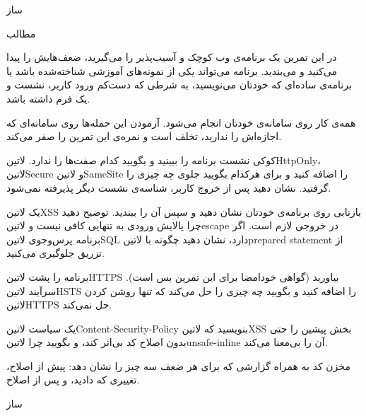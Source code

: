 \documentclass{../is-assignment}
\begin{document}
‌ساز

‌مطالب


در این تمرین یک برنامه‌ی وب کوچک و آسیب‌پذیر را می‌گیرید، ضعف‌هایش را پیدا می‌کنید و می‌بندید.
برنامه می‌تواند یکی از نمونه‌های آموزشی شناخته‌شده باشد یا برنامه‌ی ساده‌ای که خودتان می‌نویسید،
به شرطی که دست‌کم ورود کاربر، نشست و یک فرم داشته باشد.

همه‌ی کار روی سامانه‌ی خودتان انجام می‌شود.
آزمودن این حمله‌ها روی سامانه‌ای که اجازه‌اش را ندارید، تخلف است و نمره‌ی این تمرین را صفر می‌کند.


 کوکی نشست برنامه را ببینید و بگویید کدام صفت‌ها را ندارد.
 ‌لاتین{HttpOnly}، ‌لاتین{Secure} و ‌لاتین{SameSite} را اضافه کنید و برای هرکدام بگویید جلوی چه چیزی را گرفتید.
 نشان دهید پس از خروج کاربر، شناسه‌ی نشست دیگر پذیرفته نمی‌شود.



 یک ‌لاتین{XSS} بازتابی روی برنامه‌ی خودتان نشان دهید و سپس آن را ببندید.
      توضیح دهید چرا پالایش ورودی به تنهایی کافی نیست و ‌لاتین{escape} در خروجی لازم است.
 اگر برنامه پرس‌وجوی ‌لاتین{SQL} دارد، نشان دهید چگونه با ‌لاتین{prepared statement} از تزریق جلوگیری می‌کنید.



 برنامه را پشت ‌لاتین{HTTPS} بیاورید (گواهی خودامضا برای این تمرین بس است).
 سرآیند ‌لاتین{HSTS} را اضافه کنید و بگویید چه چیزی را حل می‌کند که تنها روشن کردن ‌لاتین{HTTPS} حل نمی‌کند.


یک سیاست ‌لاتین{Content-Security-Policy} بنویسید که ‌لاتین{XSS} بخش پیشین را حتی بدون اصلاح کد بی‌اثر کند،
و بگویید چرا ‌لاتین{unsafe-inline} آن را بی‌معنا می‌کند.


مخزن کد به همراه گزارشی که برای هر ضعف سه چیز را نشان دهد: پیش از اصلاح، تغییری که دادید، و پس از اصلاح.


‌ساز
\end{document}
